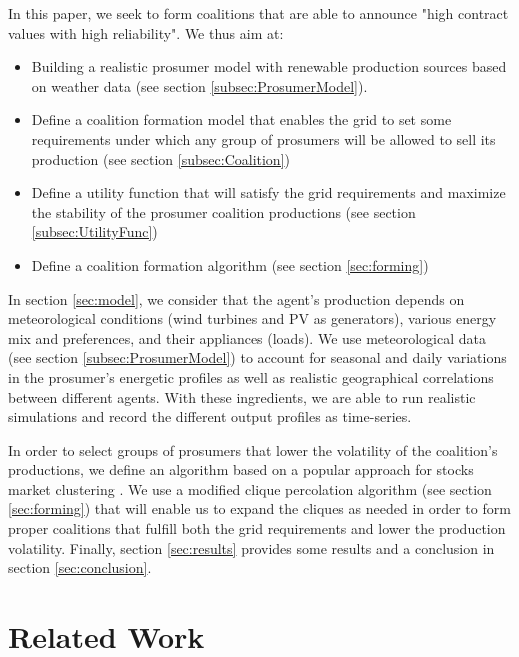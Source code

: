 \documentclass[conference]{IEEEtran}
\begin{document}
In this paper, we seek to form coalitions that are able to announce "high contract values with high reliability". We thus aim at:
\begin{itemize}
\item Building a realistic prosumer model with renewable production sources based on weather data (see section \ref{subsec:ProsumerModel}).
\item Define a coalition formation model that enables the grid to set some requirements under which any group of prosumers will be allowed to sell its production (see section \ref{subsec:Coalition})
\item Define a utility function that will satisfy the grid requirements and maximize the stability of the prosumer coalition productions (see section \ref{subsec:UtilityFunc})
\item Define a coalition formation algorithm (see section \ref{sec:forming})
\end{itemize}

In section \ref{sec:model}, we consider that the agent's production depends on meteorological conditions (wind turbines and PV as generators), various energy mix and preferences, and their appliances (loads). We use meteorological data (see section \ref{subsec:ProsumerModel}) to account for seasonal and daily variations in the prosumer's energetic profiles as well as realistic geographical correlations between different agents. With these ingredients, we are able to run realistic simulations and record the different output profiles as time-series.

In order to select groups of prosumers that lower the volatility of the coalition's productions, we define an algorithm based on a popular approach for stocks market clustering \cite{Mantegna1999}. We use a modified clique percolation algorithm (see section \ref{sec:forming}) that will enable us to expand the cliques as needed in order to form proper coalitions that fulfill both the grid requirements and lower the production volatility. Finally, section \ref{sec:results} provides some results and a conclusion in section \ref{sec:conclusion}.

%
%

\section{Related Work}
\label{sec:related}
\end{document}
